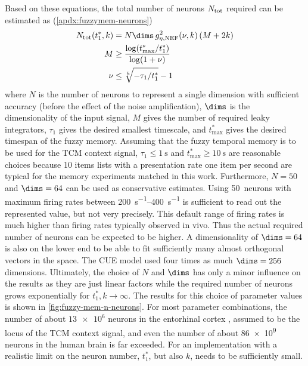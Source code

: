 Based on these equations, the total number of neurons $N_{{\mathrm{tot}}}$ required can be estimated as (\cref{apdx:fuzzymem-neurons})
\begin{align}
    N_{\ped{tot}}(t^*_1, k) &= N \dims\, g_{\eta,\ped{NEF}}^2(\nu, k) \del{M + 2k} \label{eqn:fuzzy-n-neurons}\\
    M &\geq \frac{\log(t^*_{\max} / t^*_1)}{\log(1 + \nu)} \\
    \nu &\leq \sqrt[k]{-\tau_1 / t^*_1} - 1
\end{align}
where $N$ is the number of neurons to represent a single dimension with sufficient accuracy (before the effect of the noise amplification), $\dims$ is the dimensionality of the input signal, $M$ gives the number of required leaky integrators, $\tau_1$ gives the desired smallest timescale, and $t^*_{\max}$ gives the desired timespan of the fuzzy memory.
Assuming that the fuzzy temporal memory is to be used for the TCM context signal, $\tau_1 \leq \SI{1}{\second}$ and $t^*_{\max} \geq \SI{10}{\second}$ are reasonable choices because 10 items lists with a presentation rate one item per second are typical for the memory experiments matched in this work.
Furthermore, $N = 50$ and $\dims = 64$ can be used as conservative estimates.
Using \num{50}~neurons with maximum firing rates between \SIrange{200}{400}{\second^{-1}} is sufficient to read out the represented value, but not very precisely.
This default range of firing rates is much higher than firing rates typically observed in vivo.
Thus the actual required number of neurons can be expected to be higher.
A dimensionality of $\dims = 64$ is also on the lower end to be able to fit sufficiently many almost orthogonal vectors in the space.
The CUE model used four times as much $\dims = 256$ dimensions.
Ultimately, the choice of $N$ and $\dims$ has only a minor influence on the results as they are just linear factors while the required number of neurons grows exponentially for $t^*_1, k \rightarrow \infty$.
The results for this choice of parameter values is shown in \cref{fig:fuzzy-mem-n-neurons}.
For most parameter combinations, the number of about $\num{13e6}$ neurons in the entorhinal cortex \parencite{west1998}, assumed to be the locus of the TCM context signal, and even the number of about \num{86e9} neurons in the human brain \parencite{azevedo2009} is far exceeded.
For an implementation with a realistic limit on the neuron number, $t^*_1$, but also $k$, needs to be sufficiently small.
